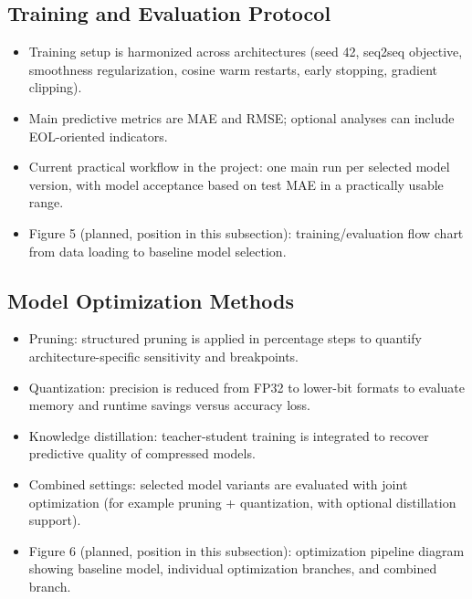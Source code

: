 ﻿\documentclass[review]{elsarticle}
\begin{document}
\subsection{Training and Evaluation Protocol}
\begin{itemize}[leftmargin=*]
\item Training setup is harmonized across architectures (seed 42, seq2seq objective, smoothness regularization, cosine warm restarts, early stopping, gradient clipping).
\item Main predictive metrics are MAE and RMSE; optional analyses can include EOL-oriented indicators.
\item Current practical workflow in the project: one main run per selected model version, with model acceptance based on test MAE in a practically usable range.
\item Figure 5 (planned, position in this subsection): training/evaluation flow chart from data loading to baseline model selection.
\end{itemize}

\subsection{Model Optimization Methods}
\begin{itemize}[leftmargin=*]
\item Pruning: structured pruning is applied in percentage steps to quantify architecture-specific sensitivity and breakpoints.
\item Quantization: precision is reduced from FP32 to lower-bit formats to evaluate memory and runtime savings versus accuracy loss.
\item Knowledge distillation: teacher-student training is integrated to recover predictive quality of compressed models.
\item Combined settings: selected model variants are evaluated with joint optimization (for example pruning + quantization, with optional distillation support).
\item Figure 6 (planned, position in this subsection): optimization pipeline diagram showing baseline model, individual optimization branches, and combined branch.
\end{itemize}
\end{document}
